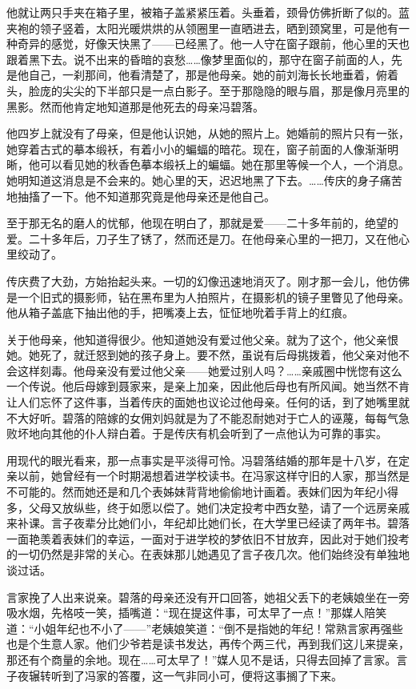 \par 他就让两只手夹在箱子里，被箱子盖紧紧压着。头垂着，颈骨仿佛折断了似的。蓝夹袍的领子竖着，太阳光暖烘烘的从领圈里一直晒进去，晒到颈窝里，可是他有一种奇异的感觉，好像天快黑了——已经黑了。他一人守在窗子跟前，他心里的天也跟着黑下去。说不出来的昏暗的哀愁……像梦里面似的，那守在窗子前面的人，先是他自己，一刹那间，他看清楚了，那是他母亲。她的前刘海长长地垂着，俯着头，脸庞的尖尖的下半部只是一点白影子。至于那隐隐的眼与眉，那是像月亮里的黑影。然而他肯定地知道那是他死去的母亲冯碧落。
\par 他四岁上就没有了母亲，但是他认识她，从她的照片上。她婚前的照片只有一张，她穿着古式的摹本缎袄，有着小小的蝙蝠的暗花。现在，窗子前面的人像渐渐明晰，他可以看见她的秋香色摹本缎袄上的蝙蝠。她在那里等候一个人，一个消息。她明知道这消息是不会来的。她心里的天，迟迟地黑了下去。……传庆的身子痛苦地抽搐了一下。他不知道那究竟是他母亲还是他自己。
\par 至于那无名的磨人的忧郁，他现在明白了，那就是爱——二十多年前的，绝望的爱。二十多年后，刀子生了锈了，然而还是刀。在他母亲心里的一把刀，又在他心里绞动了。
\par 传庆费了大劲，方始抬起头来。一切的幻像迅速地消灭了。刚才那一会儿，他仿佛是一个旧式的摄影师，钻在黑布里为人拍照片，在摄影机的镜子里瞥见了他母亲。他从箱子盖底下抽出他的手，把嘴凑上去，怔怔地吮着手背上的红痕。
\par 关于他母亲，他知道得很少。他知道她没有爱过他父亲。就为了这个，他父亲恨她。她死了，就迁怒到她的孩子身上。要不然，虽说有后母挑拨着，他父亲对他不会这样刻毒。他母亲没有爱过他父亲——她爱过别人吗？……亲戚圈中恍惚有这么一个传说。他后母嫁到聂家来，是亲上加亲，因此他后母也有所风闻。她当然不肯让人们忘怀了这件事，当着传庆的面她也议论过他母亲。任何的话，到了她嘴里就不大好听。碧落的陪嫁的女佣刘妈就是为了不能忍耐她对于亡人的诬蔑，每每气急败坏地向其他的仆人辩白着。于是传庆有机会听到了一点他认为可靠的事实。
\par 用现代的眼光看来，那一点事实是平淡得可怜。冯碧落结婚的那年是十八岁，在定亲以前，她曾经有一个时期渴想着进学校读书。在冯家这样守旧的人家，那当然是不可能的。然而她还是和几个表姊妹背背地偷偷地计画着。表妹们因为年纪小得多，父母又放纵些，终于如愿以偿了。她们决定投考中西女塾，请了一个远房亲戚来补课。言子夜辈分比她们小，年纪却比她们长，在大学里已经读了两年书。碧落一面艳羡着表妹们的幸运，一面对于进学校的梦依旧不甘放弃，因此对于她们投考的一切仍然是非常的关心。在表妹那儿她遇见了言子夜几次。他们始终没有单独地谈过话。
\par 言家挽了人出来说亲。碧落的母亲还没有开口回答，她祖父丢下的老姨娘坐在一旁吸水烟，先格吱一笑，插嘴道：“现在提这件事，可太早了一点！”那媒人陪笑道：“小姐年纪也不小了——”老姨娘笑道：“倒不是指她的年纪！常熟言家再强些也是个生意人家。他们少爷若是读书发达，再传个两三代，再到我们这儿来提亲，那还有个商量的余地。现在……可太早了！”媒人见不是话，只得去回掉了言家。言子夜辗转听到了冯家的答覆，这一气非同小可，便将这事搁了下来。
